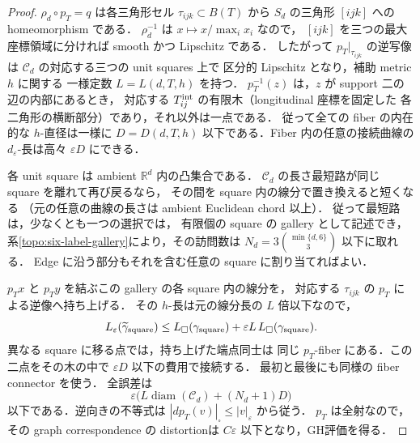 \begin{proof}
$\rho_d\circ p_T=q$ は各三角形セル $\tau_{ijk}\subset B(T)$
から $S_d$ の三角形 $[ijk]$ への homeomorphism である．
$\rho_d^{-1}$ は $x\mapsto x/\max_i x_i$ なので，
$[ijk]$ を三つの最大座標領域に分ければ smooth かつ Lipschitz である．
したがって $p_T|_{\tau_{ijk}}$ の逆写像は
$\mathcal C_d$ の対応する三つの unit squares 上で
区分的 Lipschitz となり，補助 metric $h$ に関する
一様定数 $L=L(d,T,h)$ を持つ．
$p_T^{-1}(z)$ は，$z$ が support 二の辺の内部にあるとき，
対応する $T_{ij}^{\rm int}$ の有限木（longitudinal 座標を固定した
各二角形の横断部分）であり，それ以外は一点である．
従って全ての fiber の内在的な $h$-直径は一様に
$D=D(d,T,h)$ 以下である．Fiber 内の任意の接続曲線の
$d_\varepsilon$-長は高々 $\varepsilon D$ にできる．

各 unit square は ambient $\mathbb R^d$ 内の凸集合である．
$\mathcal C_d$ の長さ最短路が同じ square を離れて再び戻るなら，
その間を square 内の線分で置き換えると短くなる
（元の任意の曲線の長さは ambient Euclidean chord 以上）．
従って最短路は，少なくとも一つの選択では，
有限個の square の gallery として記述でき，
系\ref{topo:six-label-gallery}により，その訪問数は
$N_d=3\binom{\min\{d,6\}}{3}$ 以下に取れる．
Edge に沿う部分もそれを含む任意の square に割り当てればよい．

$p_Tx$ と $p_Ty$ を結ぶこの gallery の各 square 内の線分を，
対応する $\tau_{ijk}$ の $p_T$ による逆像へ持ち上げる．
その $h$-長は元の線分長の $L$ 倍以下なので，
\[
 L_\varepsilon(\widetilde\gamma_{\rm square})
 \le L_\square(\gamma_{\rm square})
      +\varepsilon L\,L_\square(\gamma_{\rm square}).
\]
異なる square に移る点では，持ち上げた端点同士は
同じ $p_T$-fiber にある．この二点をその木の中で
$\varepsilon D$ 以下の費用で接続する．
最初と最後にも同様の fiber connector を使う．
全誤差は
\[
 \varepsilon\bigl(L\operatorname{diam}(\mathcal C_d)
                          +(N_d+1)D\bigr)
\]
以下である．逆向きの不等式は
$|dp_T(v)|_\square\le |v|_\varepsilon$ から従う．
$p_T$ は全射なので，その graph correspondence の distortionは
$C\varepsilon$ 以下となり，GH評価を得る．
\end{proof}

